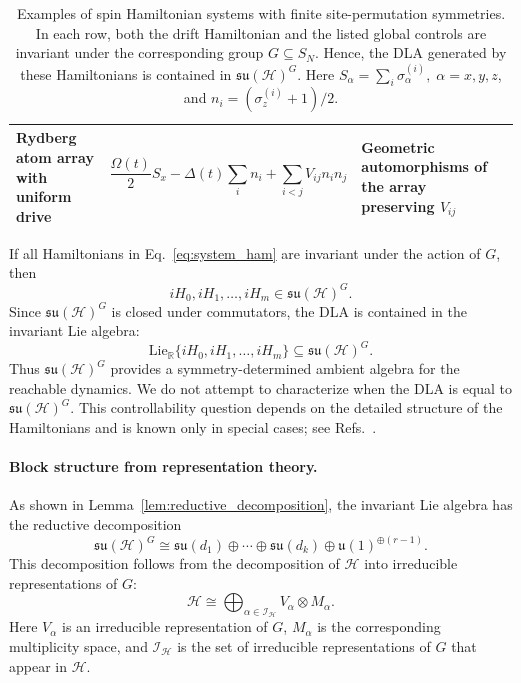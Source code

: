 \documentclass[10pt,twocolumn,superscriptaddress,aps,amsmath,amssymb,citeautoscript,floatfix,prx]{revtex4-2}
\newcounter{alg}
\theoremstyle{plain}
\theoremstyle{plain}
\theoremstyle{plain}
\theoremstyle{plain}
\theoremstyle{plain}
\theoremstyle{plain}
\theoremstyle{plain}
\theoremstyle{definition}
\theoremstyle{plain}
\begin{document}
\begin{table}[t]
\begin{tabular}{llll}
\parbox[t]{0.19\textwidth}{Rydberg atom array with uniform drive}
&
\parbox[t]{0.38\textwidth}{
\[
\frac{\Omega(t)}{2}S_x
-\Delta(t)\sum_i n_i
+\sum_{i<j}V_{ij}n_in_j
\]
}
&
\parbox[t]{0.22\textwidth}{
Geometric automorphisms of the array preserving \(V_{ij}\)
}
&
\parbox[t]{0.13\textwidth}{
\cite{Browaeys2020,Daley2022}
}
\\

\hline
\end{tabular}
\caption{
Examples of spin Hamiltonian systems with finite site-permutation symmetries. 
In each row, both the drift Hamiltonian and the listed global controls are invariant under the corresponding group \(G\subseteq S_N\). 
Hence, the DLA generated by these Hamiltonians is contained in
\(\mathfrak{su}(\mathcal H)^G\). Here $S_{\alpha}=\sum_i \sigma_{\alpha}^{(i)}, \; \alpha=x, y, z$, and $n_i=\left(\sigma_z^{(i)}+1\right) / 2$.
}
\end{table}

If all Hamiltonians in Eq.~\eqref{eq:system_ham} are invariant under the action of $G$, then
$$
iH_0,iH_1,\ldots,iH_m
\in
\mathfrak{su}(\mathcal H)^G .
$$
Since $\mathfrak{su}(\mathcal H)^G$ is closed under commutators, the DLA is contained in the invariant Lie algebra:
$$
\mathrm{Lie}_{\mathbb R}
\{iH_0,iH_1,\ldots,iH_m\}
\subseteq
\mathfrak{su}(\mathcal H)^G .
$$
Thus $\mathfrak{su}(\mathcal H)^G$ provides a symmetry-determined ambient algebra for the reachable dynamics. 
We do not attempt to characterize when the DLA is equal to $\mathfrak{su}(\mathcal H)^G$. 
This controllability question depends on the detailed structure of the Hamiltonians and is known only in special cases; see Refs.~\cite{Albertini2020, Kokcu2024, Wiersema2024}.

\paragraph{Block structure from representation theory.}

As shown in Lemma~\ref{lem:reductive_decomposition}, the invariant Lie algebra has the reductive decomposition
\begin{equation}\label{eq:inv_alg_decomp}
\mathfrak{su}(\mathcal H)^G
\cong
\mathfrak{su}(d_1)
\oplus
\cdots
\oplus
\mathfrak{su}(d_k)
\oplus
\mathfrak{u}(1)^{\oplus(r-1)} .
\end{equation}
This decomposition follows from the decomposition of $\mathcal H$ into irreducible representations of $G$:
\begin{equation}\label{eq:H_G_irrep_decomp}
\mathcal H
\cong
\bigoplus_{\alpha\in\mathcal I_{\mathcal H}}
V_\alpha\otimes M_\alpha .
\end{equation}
Here $V_\alpha$ is an irreducible representation of $G$, $M_\alpha$ is the corresponding multiplicity space, and $\mathcal I_{\mathcal H}$ is the set of irreducible representations of $G$ that appear in $\mathcal H$.
\end{document}

